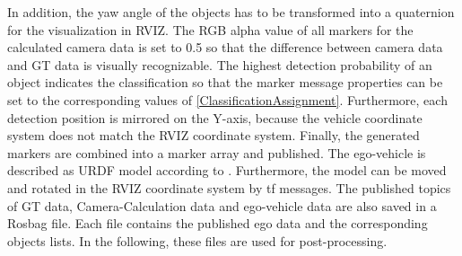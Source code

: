 In addition, the yaw angle of the objects has to be transformed into a quaternion for the visualization in \ac{RVIZ}. The RGB alpha value of all markers for the calculated camera data is set to 0.5 so that the difference between camera data and GT data is visually recognizable. 
The highest detection probability of an object indicates the classification so that the marker message properties can be set to the corresponding values of \cref{ClassificationAssignment}. Furthermore, each detection position is mirrored on the Y-axis, because the vehicle coordinate system does not match the \ac{RVIZ} coordinate system. Finally, the generated markers are combined into a marker array and published.
The ego-vehicle is described as URDF model according to \cite{URDF}.
Furthermore, the model can be moved and rotated in the \ac{RVIZ} coordinate system by tf messages. 
The published topics of \ac{GT} data, Camera-Calculation data and ego-vehicle data are also saved in a Rosbag file. Each file contains the published ego data and the corresponding objects lists. In the following, these files are used for post-processing.